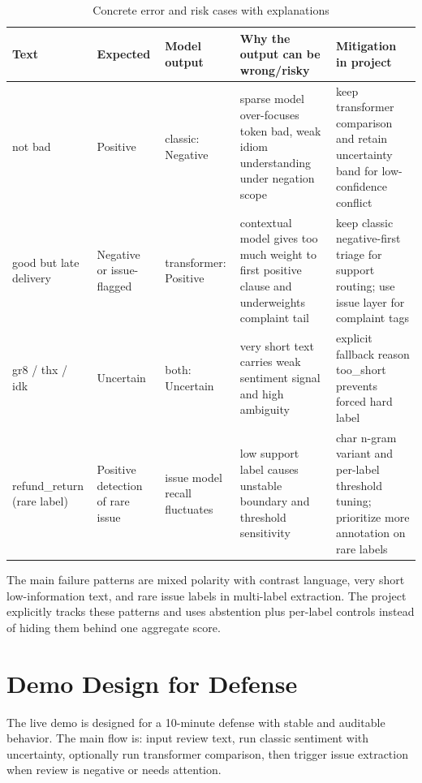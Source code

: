 \documentclass[12pt,a4paper]{article}
\begin{document}
\begin{table}[H]
\centering
\caption{Concrete error and risk cases with explanations}
\label{tab:nlp_error_cases}
\begin{tabular}{>{\raggedright\arraybackslash}p{2.9cm} >{\centering\arraybackslash}p{2.0cm} >{\raggedright\arraybackslash}p{2.7cm} >{\raggedright\arraybackslash}p{4.4cm} >{\raggedright\arraybackslash}p{2.6cm}}
\toprule
Text & Expected & Model output & Why the output can be wrong/risky & Mitigation in project \\
\midrule
not bad & Positive & classic: Negative & sparse model over-focuses token bad, weak idiom understanding under negation scope & keep transformer comparison and retain uncertainty band for low-confidence conflict \\
good but late delivery & Negative or issue-flagged & transformer: Positive & contextual model gives too much weight to first positive clause and underweights complaint tail & keep classic negative-first triage for support routing; use issue layer for complaint tags \\
gr8 / thx / idk & Uncertain & both: Uncertain & very short text carries weak sentiment signal and high ambiguity & explicit fallback reason too\_short prevents forced hard label \\
refund\_return (rare label) & Positive detection of rare issue & issue model recall fluctuates & low support label causes unstable boundary and threshold sensitivity & char n-gram variant and per-label threshold tuning; prioritize more annotation on rare labels \\
\bottomrule
\end{tabular}
\end{table}

The main failure patterns are mixed polarity with contrast language, very short low-information text, and rare issue labels in multi-label extraction. The project explicitly tracks these patterns and uses abstention plus per-label controls instead of hiding them behind one aggregate score.

\section{Demo Design for Defense}
The live demo is designed for a 10-minute defense with stable and auditable behavior. The main flow is: input review text, run classic sentiment with uncertainty, optionally run transformer comparison, then trigger issue extraction when review is negative or needs attention.
\end{document}
